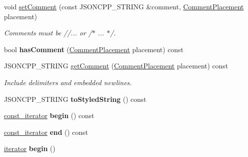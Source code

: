 \begin{DoxyCompactItemize}
\mbox{\label{classJson_1_1Value_a2c5d13a5f45eb77e912008778e65b27f}} 
void \hyperlink{classJson_1_1Value_a2c5d13a5f45eb77e912008778e65b27f}{set\+Comment} (const J\+S\+O\+N\+C\+P\+P\+\_\+\+S\+T\+R\+I\+NG \&comment, \hyperlink{namespaceJson_a4fc417c23905b2ae9e2c47d197a45351}{Comment\+Placement} placement)
\begin{DoxyCompactList}\small\item\em Comments must be //... or /$\ast$ ... $\ast$/. \end{DoxyCompactList}\item 
\mbox{\label{classJson_1_1Value_a65d8e3ab6a5871cbd019a3e0f0b944a3}} 
bool {\bfseries has\+Comment} (\hyperlink{namespaceJson_a4fc417c23905b2ae9e2c47d197a45351}{Comment\+Placement} placement) const
\item 
\mbox{\label{classJson_1_1Value_a82817229a986f0b254e31d5c83066ffe}} 
J\+S\+O\+N\+C\+P\+P\+\_\+\+S\+T\+R\+I\+NG \hyperlink{classJson_1_1Value_a82817229a986f0b254e31d5c83066ffe}{get\+Comment} (\hyperlink{namespaceJson_a4fc417c23905b2ae9e2c47d197a45351}{Comment\+Placement} placement) const
\begin{DoxyCompactList}\small\item\em Include delimiters and embedded newlines. \end{DoxyCompactList}\item 
\mbox{\label{classJson_1_1Value_a00154cc8662d7a845ed59e175c2496cb}} 
J\+S\+O\+N\+C\+P\+P\+\_\+\+S\+T\+R\+I\+NG {\bfseries to\+Styled\+String} () const
\item 
\mbox{\label{classJson_1_1Value_a015459a3950c198d63a2d3be8f5ae296}} 
\hyperlink{classJson_1_1ValueConstIterator}{const\+\_\+iterator} {\bfseries begin} () const
\item 
\mbox{\label{classJson_1_1Value_a3e443cd0ef24f7e028b175e47ee045e0}} 
\hyperlink{classJson_1_1ValueConstIterator}{const\+\_\+iterator} {\bfseries end} () const
\item 
\mbox{\label{classJson_1_1Value_a2d45bb2e68e8f22fe356d7d955ebd3c9}} 
\hyperlink{classJson_1_1ValueIterator}{iterator} {\bfseries begin} ()
\item 

\end{DoxyCompactItemize}
